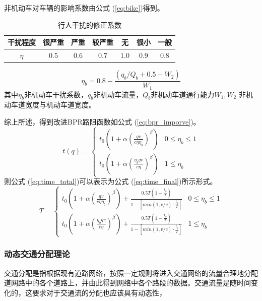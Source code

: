 \documentclass[fontset=windows,a4paper,12pt]{ctexart}
\renewcommand{\eqref}[1]{公式 (\ref{#1})}
\begin{document}
			非机动车对车辆的影响系数由\eqref{eq:bike}得到。
			\begin{table}[!htbp]
				\centering
				\caption{行人干扰的修正系数}
				\label{tab:walker_noise}
				\begin{tabular}{c|cccccc}
					\hline 
					干扰程度 & 很严重 & 严重 & 较严重 & 无 & 很小 & 一般 \\ 
					\hline 
					$\eta$ & 0.5 & 0.6 & 0.7 & 1.0 & 0.9 & 0.8 \\ 
					\hline 
				\end{tabular}
			\end{table}
			\begin{equation}
				\eta_b = 0.8-\frac{(q_b/Q_b+0.5-W_2)}{W_1}
				\label{eq:bike}
			\end{equation}
			其中$ \eta_b $非机动车干扰系数，$ q_b $非机动车流量，$ Q_b $非机动车道通行能力$ W_1,W_2 $
			非机动车道宽度与机动车道宽度。
			
			综上所述，得到改进BPR路阻函数如\eqref{eq:bpr_imporve}。
			\begin{equation}
				t(q)=\left\lbrace
				\begin{array}{lr}
					t_0(1+\alpha(\frac{qv}{c\eta\eta_b})^\beta) & 0\leq\eta_b\leq1\\
					t_0(1+\alpha(\frac{\eta_bqv}{c\eta})^\beta) & 1\leq\eta_b
				\end{array}	
				\right.
				\label{eq:bpr_imporve}
			\end{equation}			
			则\eqref{eq:time_total}可以表示为\eqref{eq:time_final}所示形式。
			\begin{equation}
				T=\left\lbrace
				\begin{array}{lr}
					t_0(1+\alpha(\frac{qv}{c\eta\eta_b})^\beta)+\frac{0.5T(1-\frac{t_g}{T})}{1-[min(1,v/c)\cdot{\frac{t_g}{T}}]} & 0\leq\eta_b\leq1\\
					t_0(1+\alpha(\frac{\eta_bqv}{c\eta})^\beta)+\frac{0.5T(1-\frac{t_g}{T})}{1-[min(1,v/c)\cdot{\frac{t_g}{T}}]} & 1\leq\eta_b
				\end{array}	
				\right.
				\label{eq:time_final}
			\end{equation}
		\subsubsection{动态交通分配理论}
			交通分配是指根据现有道路网络，按照一定规则将进入交通网络的流量合理地分配道网路中的各个道路上，并由此得到网络中各个路段的数据。交通流量是随时间变化的，这要求对于交通流的分配也应该具有动态性\cite{陆化普1996动态交通分配理论的回顾与展望}，
			
\end{document}
